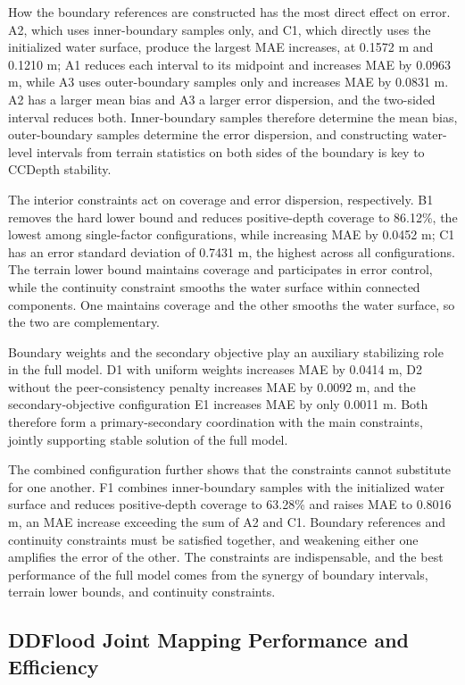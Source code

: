 \documentclass[authoryear,preprint,12pt]{elsarticle}
\begin{document}
How the boundary references are constructed has the most direct effect on error. A2, which uses inner-boundary samples only, and C1, which directly uses the initialized water surface, produce the largest MAE increases, at 0.1572 m and 0.1210 m; A1 reduces each interval to its midpoint and increases MAE by 0.0963 m, while A3 uses outer-boundary samples only and increases MAE by 0.0831 m. A2 has a larger mean bias and A3 a larger error dispersion, and the two-sided interval reduces both. Inner-boundary samples therefore determine the mean bias, outer-boundary samples determine the error dispersion, and constructing water-level intervals from terrain statistics on both sides of the boundary is key to CCDepth stability.

The interior constraints act on coverage and error dispersion, respectively. B1 removes the hard lower bound and reduces positive-depth coverage to 86.12\%, the lowest among single-factor configurations, while increasing MAE by 0.0452 m; C1 has an error standard deviation of 0.7431 m, the highest across all configurations. The terrain lower bound maintains coverage and participates in error control, while the continuity constraint smooths the water surface within connected components. One maintains coverage and the other smooths the water surface, so the two are complementary.

Boundary weights and the secondary objective play an auxiliary stabilizing role in the full model. D1 with uniform weights increases MAE by 0.0414 m, D2 without the peer-consistency penalty increases MAE by 0.0092 m, and the secondary-objective configuration E1 increases MAE by only 0.0011 m. Both therefore form a primary-secondary coordination with the main constraints, jointly supporting stable solution of the full model.

The combined configuration further shows that the constraints cannot substitute for one another. F1 combines inner-boundary samples with the initialized water surface and reduces positive-depth coverage to 63.28\% and raises MAE to 0.8016 m, an MAE increase exceeding the sum of A2 and C1. Boundary references and continuity constraints must be satisfied together, and weakening either one amplifies the error of the other. The constraints are indispensable, and the best performance of the full model comes from the synergy of boundary intervals, terrain lower bounds, and continuity constraints.

\FloatBarrier

\subsection{DDFlood Joint Mapping Performance and Efficiency}\label{sec:ddflood_framework_evaluation}
\end{document}
